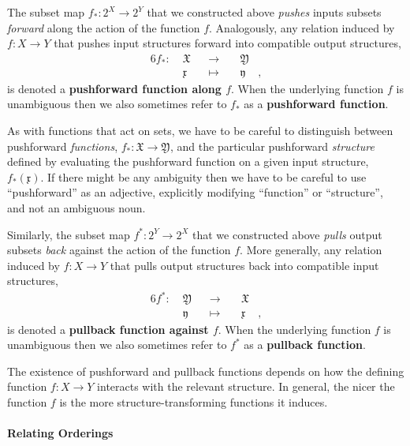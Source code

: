 \documentclass[
  letterpaper,
  DIV=11,
  numbers=noendperiod]{scrartcl}
\let\oldparagraph\paragraph
\renewcommand{\paragraph}[1]{\oldparagraph{#1}\mbox{}}
\begin{document}
The subset map \(f_{*} : 2^X \rightarrow 2^Y\) that we constructed above
\emph{pushes} inputs subsets \emph{forward} along the action of the
function \(f\). Analogously, any relation induced by
\(f : X \rightarrow Y\) that pushes input structures forward into
compatible output structures, \begin{alignat*}{6}
f_{*} :\; & \mathfrak{X} & &\rightarrow& \; & \mathfrak{Y} &
\\
& \mathfrak{x} & &\mapsto& & \mathfrak{y} &,
\end{alignat*} is denoted a \textbf{pushforward function along \(f\)}.
When the underlying function \(f\) is unambiguous then we also sometimes
refer to \(f_{*}\) as a \textbf{pushforward function}.

As with functions that act on sets, we have to be careful to distinguish
between pushforward \emph{functions},
\(f_{*} : \mathfrak{X} \rightarrow \mathfrak{Y}\), and the particular
pushforward \emph{structure} defined by evaluating the pushforward
function on a given input structure, \(f_{*}(\mathfrak{x})\). If there
might be any ambiguity then we have to be careful to use ``pushforward''
as an adjective, explicitly modifying ``function'' or ``structure'', and
not an ambiguous noun.

Similarly, the subset map \(f^{*} : 2^Y \rightarrow 2^X\) that we
constructed above \emph{pulls} output subsets \emph{back} against the
action of the function \(f\). More generally, any relation induced by
\(f : X \rightarrow Y\) that pulls output structures back into
compatible input structures, \begin{alignat*}{6}
f^{*} :\; & \mathfrak{Y} & &\rightarrow& \; & \mathfrak{X} &
\\
& \mathfrak{y} & &\mapsto& & \mathfrak{x} &,
\end{alignat*} is denoted a \textbf{pullback function against \(f\)}.
When the underlying function \(f\) is unambiguous then we also sometimes
refer to \(f^{*}\) as a \textbf{pullback function}.

The existence of pushforward and pullback functions depends on how the
defining function \(f : X \rightarrow Y\) interacts with the relevant
structure. In general, the nicer the function \(f\) is the more
structure-transforming functions it induces.

\paragraph{Relating Orderings}\label{relating-orderings}
\end{document}
